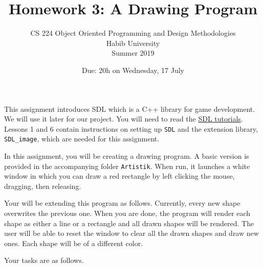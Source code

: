 \documentclass[addpoints]{exam}
\title{Homework 3: A Drawing Program}
\author{CS 224 Object Oriented Programming and Design Methodologies\\Habib University\\Summer 2019}
\date{Due: 20h on Wednesday, 17 July}
\begin{document}
\maketitle
\thispagestyle{empty}

This assignment introduces SDL which is a C++ library for game development. We will use it later for our project. You will need to read the \href{http://lazyfoo.net/tutorials/SDL/}{SDL tutorials}. Lessons 1 and 6 contain instructions on setting up \texttt{SDL} and the extension library, \texttt{SDL\_image}, which are needed for this assignment.

\begin{questions}

In this assignment, you will be creating a drawing program. A basic version is provided in the accompanying folder \texttt{Artistik}. When run, it launches a white window in which you can draw a red rectangle by left clicking the mouse, dragging, then releasing. 

Your will be extending this program as follows. Currently, every new shape overwrites the previous one. When you are done, the program will render each shape as either a line or a rectangle and all drawn shapes will be rendered. The user will be able to reset the window to clear all the drawn shapes and draw new ones. Each shape will be of a different color.

Your tasks are as follows.
\end{questions}
\end{document}
